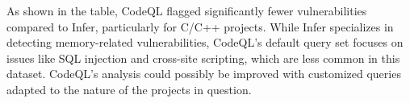 As shown in the table, CodeQL flagged significantly fewer vulnerabilities compared to Infer, particularly for C/C++ projects. While Infer specializes in detecting memory-related vulnerabilities, CodeQL's default query set focuses on issues like SQL injection and cross-site scripting, which are less common in this dataset. CodeQL's analysis could possibly be improved with customized queries adapted to the nature of the projects in question.